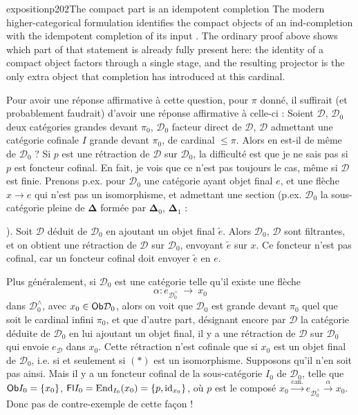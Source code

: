 \begin{dcomment}{exposition}{p202}{The compact part is an idempotent completion}
The modern higher-categorical formulation identifies the compact objects of an ind-completion with the idempotent completion of its input \citep[Lemma~5.4.2.4]{Lurie2009HTT}. The ordinary proof above shows which part of that statement is already fully present here: the identity of a compact object factors through a single stage, and the resulting projector is the only extra object that completion has introduced at this cardinal.
\end{dcomment}


Pour avoir une réponse affirmative à cette question, pour $\pi$ donné, il suffirait (et probablement faudrait) d'avoir une réponse affirmative à celle-ci : Soient $\mathcal{D}$, $\mathcal{D}_0$ deux catégories grandes devant $\pi_0$, $\mathcal{D}_0$ facteur direct de $\mathcal{D}$, $\mathcal{D}$ admettant une catégorie cofinale $I$ grande devant $\pi_0$, de cardinal $\leqslant\pi$. Alors en est-il de même de $\mathcal{D}_0$ ? Si $p$ est une rétraction de $\mathcal{D}$ sur $\mathcal{D}_0$, la difficulté est que je ne sais pas si $p$ est foncteur cofinal. En fait, je vois que
ce n'est pas toujours le cas, même si $\mathcal{D}$ est finie. Prenons p.ex. pour $\mathcal{D}_0$ une catégorie ayant objet final $e$, et une flèche $x\longrightarrow e$ qui n'est pas un isomorphisme, et admettant une section (p.ex. $\mathcal{D}_0$ la sous-catégorie pleine de $\boldsymbol{\Delta}$ formée par $\boldsymbol{\Delta}_0$, $\boldsymbol{\Delta}_1$ :  ). Soit $\mathcal{D}$ déduit de $\mathcal{D}_0$ en ajoutant un objet final $\tilde{e}$. Alors $\mathcal{D}_0$, $\mathcal{D}$ sont filtrantes, et on obtient une rétraction de $\mathcal{D}$ sur $\mathcal{D}_0$, envoyant $\tilde{e}$ sur $x$. Ce foncteur n'est pas cofinal, car un foncteur cofinal doit envoyer $\tilde{e}$ en $e$.

Plus généralement, si $\mathcal{D}_0$ est une catégorie telle qu'il existe une flèche
\[
\alpha : e_{\mathcal{D}_0^\wedge} \ \longrightarrow \ x_0 \tag*{$(*)$}
\]
dans $\mathcal{D}_0^\wedge$, avec $x_0\in\mathsf{Ob}\mathcal{D}_0$, alors on voit que $\mathcal{D}_0$ est grande devant $\pi_0$ quel que soit le cardinal infini $\pi_0$, et que d'autre part, désignant encore par $\mathcal{D}$ la catégorie déduite de $\mathcal{D}_0$ en lui ajoutant un objet final, il y a une rétraction de $\mathcal{D}$ sur $\mathcal{D}_0$ qui envoie $e_{\mathcal{D}}$ dans $x_0$. Cette rétraction n'est cofinale que si $x_0$ est un objet final de $\mathcal{D}_0$, i.e. si et seulement si $(*)$ est un isomorphisme. Supposons qu'il n'en soit pas ainsi. Mais il y a un foncteur cofinal de la sous-catégorie $I_0$ de $\mathcal{D}_0$, telle que $\mathsf{Ob} I_0=\{x_0\}$, $\mathsf{Fl} I_0=\operatorname{End}_{I_0}(x_0)=\{p,\mathrm{id}_{x_0}\}$, où $p$ est le composé $x_0\xrightarrow{\text{can.}}e_{\mathcal{D}_0^\wedge}\xrightarrow{\alpha}x_0$. Donc pas de contre-exemple de cette façon !

